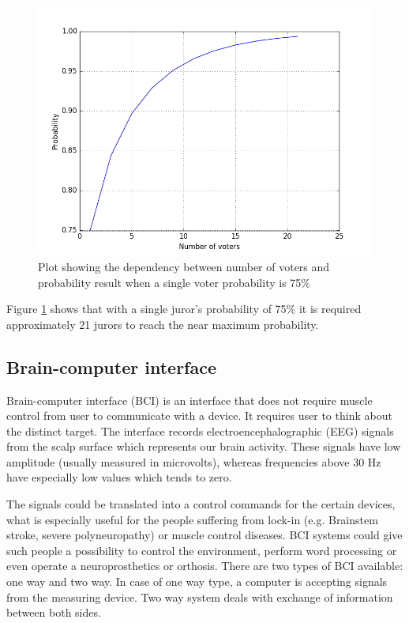 \documentclass[12pt]{article}
\begin{document}
\begin{figure} [H]
\begin{center}
\includegraphics[width=1\textwidth]{condorcet}
\caption{Plot showing the dependency between number of voters and probability result when a single voter probability is 75\%}
\label{fig:condorcet}
\end{center}
\end{figure}

Figure \ref{fig:condorcet} shows that with a single juror's probability of 75\% it is required approximately 21 jurors to reach the near maximum probability.
\subsection{Brain-computer interface}

Brain-computer interface (BCI) is an interface that does not require muscle control from user to communicate with a device. It requires user to think about the distinct target. The interface records electroencephalographic (EEG) signals from the scalp surface which represents our brain activity. These signals have low amplitude (usually measured in microvolts), whereas frequencies above 30 Hz have especially low values which tends to zero.\cite{bci_vidal}

The signals could be translated into a control commands for the certain devices, what is especially useful for the people suffering from lock-in (e.g. Brainstem stroke, severe polyneuropathy) or muscle control diseases.  BCI systems could give such people a possibility to control the environment, perform word processing or even operate a neuroprosthetics or orthosis.
There are two types of BCI available: one way and two way. In case of one way type, a computer is accepting signals from the measuring device. Two way system deals with exchange of information between both sides.\cite{bci_shivangi}
\end{document}

